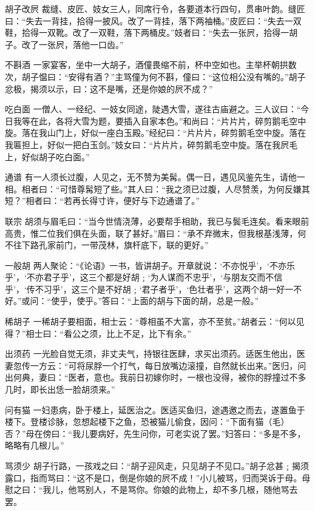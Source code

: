 \documentclass[12pt,UTF8]{ctexbook}
\begin{document}
胡子改屄
裁缝、皮匠、妓女三人，同席行令，各要道本行四句，贯串叶韵。缝匠曰：“失去一背挂，拾得一披风。改了一背挂，落下两袖桶。”皮匠曰：“失去一双鞋，拾得一双靴。改了一双鞋，落下两桶皮。”妓者曰：“失去一张屄，拾得一胡子。改了一张屄，落他一口齿。”

不斟酒
一家宴客，坐中一大胡子，酒僮畏缩不前，杯中空如也。主举杯朝拱数次，胡子愠曰：“安得有酒？”主骂僮为何不斟，僮曰：“这位相公没有嘴的。”胡子忿极，揭须以示，曰：这不是嘴，还是你娘的屄不成？”

吃白面
一僧人、一经纪、一妓女同途，陡遇大雪，遂往古庙避之。三人议曰：“今日我等在此，各将大雪为题，要插入自家本色。”和尚曰：“片片片，碎剪鹅毛空中旋。落在我山门上，好似一座白玉殿。”经纪曰：“片片片，碎剪鹅毛空中旋。落在我匾担上，好似一把白玉剑。”妓女曰：“片片片，碎剪鹅毛空中旋。落在我屄毛上，好似胡子吃白面。”

通谱
有一人须长过腹，人见之，无不赞为美髯。偶一日，遇见风鉴先生，请他一相。相者曰：“可惜尊髯短了些。”其人曰：“我之须已过腹，人尽赞羡，为何反嫌其短？”相者曰：“若再长得寸许，便好与下边通谱了。”

联宗
胡须与眉毛曰：“当今世情浇薄，必要帮手相助，我已与鬓毛连矣。看来眼前高贵，惟二位我们俱在头面，联了甚好。”眉曰：“承不弃微末，但我根基浅薄，何不往下路孔家前门，一带茂林，旗杆底下，联的更好。”

一般胡
两人聚论：“《论语》一书，皆讲胡子。开章就说：‘不亦悦乎’，‘不亦乐乎’，‘不亦君子乎’，这三个都是好胡﹔‘为人谋而不忠乎’，‘与朋友交而不信乎’，‘传不习乎’，这三个是不好胡﹔‘君子者乎’，‘色壮者乎’，这两个胡一好一不好。”或问：“使乎，使乎。”答曰：“上面的胡与下面的胡，总是一般。”

稀胡子
一稀胡子要相面，相士云：“尊相虽不大富，亦不至贫。”胡者云：“何以见得？”相士曰：“看公之须，比上不足，比下有余。”

出须药
一光脸自觉无须，非丈夫气，持银往医肆，求买出须药。适医生他出，医妻忽传一方云：“可将尿脬一个打气，每日放嘴边滚撞，自然就长出来。”医归，问出何典，妻曰：“医者，意也。我前日初嫁你时，一根也没得，被你的脬撞过不多几时，即长出恁一脸胡须来。”

问有猫
一妇患病，卧于楼上，延医治之。医适买鱼归，途遇邀之而去，遂置鱼于楼下。登楼诊脉，忽想起楼下之鱼，恐被猫儿偷食，因问：“下面有猫（毛）否？”母在傍曰：“我儿要病好，先生问你，可老实说了罢。”妇答曰：“多是不多，略略有几根儿。”

骂须少
胡子行路，一孩戏之曰：“胡子迎风走，只见胡子不见口。”胡子忿甚﹔揭须露口，指而骂曰：“这不是口，倒是你娘的屄不成！”小儿被骂，归而哭诉于母。母慰之曰：“我儿，他骂别人，不是骂你。你娘的此物上，却不多几根，随他骂去罢。
\end{document}
